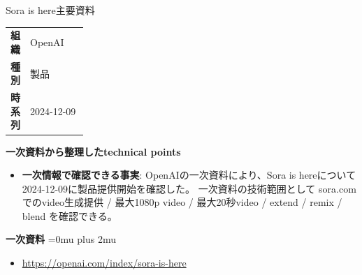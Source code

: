 \begin{technicalnote}{Sora is here}{主要資料}
\begingroup
\begin{tabularx}{\linewidth}{@{}>{\bfseries}p{0.22\linewidth}X@{}}
組織 & OpenAI \\
種別 & 製品 \\
時系列 & 2024-12-09 \\
\end{tabularx}
\smallskip
{\bfseries 一次資料から整理したtechnical points}
\begin{itemize}[leftmargin=1.5em,itemsep=0.35em]
\item \textbf{一次情報で確認できる事実}: OpenAIの一次資料により、Sora is hereについて2024-12-09に製品提供開始を確認した。 一次資料の技術範囲として sora.comでのvideo生成提供 / 最大1080p video / 最大20秒video / extend / remix / blend を確認できる。
\end{itemize}
\begin{minipage}{\linewidth}
\begin{samepage}
{\bfseries 一次資料}
\begingroup\sloppy
\Urlmuskip=0mu plus 2mu\relax
\begin{itemize}[leftmargin=1.5em,itemsep=0.25em]
\item {\scriptsize\url{https://openai.com/index/sora-is-here}}
\end{itemize}
\endgroup
\end{samepage}
\end{minipage}
\endgroup
\end{technicalnote}
\medskip

